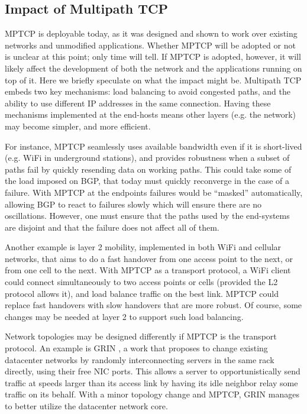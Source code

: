 \subsection{Impact of Multipath TCP}

MPTCP is deployable today, as it was designed and shown to work over existing networks and unmodified applications.
Whether MPTCP will be adopted or not is unclear at this point; only time will tell.
If MPTCP is adopted, however, it will likely affect the development of both the network and the applications running 
on top of it. Here we briefly speculate on what the impact might be. 
Multipath TCP embeds two key mechanisms: load balancing to avoid congested paths, and the ability 
to use different IP addresses in the same connection. Having these mechanisms implemented at the end-hosts
means other layers (e.g. the network) may become simpler, and more efficient.

For instance, MPTCP seamlessly uses available bandwidth even if it is short-lived (e.g. WiFi in underground stations), 
and provides robustness when a subset of paths fail by quickly resending data on working paths. This could take
some of the load imposed on BGP, that today must quickly reconverge in the case of a failure. With MPTCP at the endpoints
failures would be ``masked'' automatically, allowing BGP to react to failures slowly which will ensure there are no 
oscillations. However, one must ensure that the paths used by the end-systems are disjoint and that the failure
does not affect all of them.

Another example is layer 2 mobility, implemented in both WiFi and cellular networks, that aims to do a fast handover from 
one access point to the next, or from one cell to the next. With MPTCP as a transport protocol, a WiFi client could connect
simultaneously to two access points or cells (provided the L2 protocol allows it), and load balance traffic on the best 
link. MPTCP could replace fast handovers with slow handovers that are more robust. Of course, some changes may be needed 
at layer 2 to support such load balancing.

Network topologies may be designed differently if MPTCP is the transport protocol. An example is GRIN \cite{grin}, a work that
proposes to change existing datacenter networks by randomly interconnecting servers in the same rack directly, using their free 
NIC ports. This allows a server to opportunistically send traffic at speeds larger than its access link by having its idle neighbor 
relay some traffic on its behalf. With a minor topology change and MPTCP, GRIN manages to better utilize the datacenter network core.

